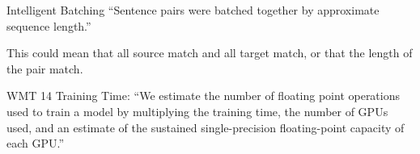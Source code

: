 \documentclass{beamer}
\begin{document}
\begin{frame}{Intelligent Batching}{}
``Sentence pairs were batched together by approximate sequence length.''

This could mean that all source match and all target match, or that the length of the pair match.
\end{frame}

\begin{frame}{WMT 14}{}
Training Time: ``We estimate the number of floating point operations used to train a model by multiplying the training time, the number of GPUs used, and an estimate of the sustained single-precision floating-point capacity of each GPU.''
\end{frame}
\end{document}
